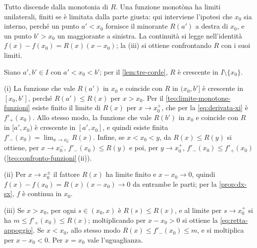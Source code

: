 \begin{schema}
\end{schema}

\begin{strategia}
Tutto discende dalla monotonia di $R$. Una funzione monotòna ha limiti unilaterali, finiti
se è limitata dalla parte giusta: qui interviene l'ipotesi che $x_{0}$ sia interno, perché
un punto $a'<x_{0}$ fornisce il minorante $R(a')$ a destra di $x_{0}$, e un punto
$b'>x_{0}$ un maggiorante a sinistra. La continuità si legge nell'identità
$f(x)-f(x_{0})=R(x)(x-x_{0})$; la (iii) si ottiene confrontando $R$ con i suoi limiti.
\end{strategia}

\begin{dimostrazione}
Siano $a',b'\in I$ con $a'<x_{0}<b'$; per il \cref{lem:tre-corde}, $R$ è crescente in
$I\setminus\{x_{0}\}$.

(i) La funzione che vale $R(a')$ in $x_{0}$ e coincide con $R$ in $(x_{0},b']$ è crescente
in $[x_{0},b']$, perché $R(a')\le R(x)$ per $x>x_{0}$. Per il \cref{teo:limite-monotone-funzioni}
esiste finito il limite di $R(x)$ per $x\to x_{0}^{+}$, che per la \eqref{eq:derivata-xi}
è $f'_{+}(x_{0})$. Allo stesso modo, la funzione che vale $R(b')$ in $x_{0}$ e coincide
con $R$ in $[a',x_{0})$ è crescente in $[a',x_{0}]$, e quindi esiste finita
$f'_{-}(x_{0})=\lim_{x\to x_{0}^{-}}R(x)$. Infine, se $x<x_{0}<y$, da $R(x)\le R(y)$ si
ottiene, per $x\to x_{0}^{-}$, $f'_{-}(x_{0})\le R(y)$ e poi, per $y\to x_{0}^{+}$,
$f'_{-}(x_{0})\le f'_{+}(x_{0})$ (\cref{teo:confronto-funzioni}\,(ii)).

(ii) Per $x\to x_{0}^{\pm}$ il fattore $R(x)$ ha limite finito e $x-x_{0}\to0$, quindi
$f(x)-f(x_{0})=R(x)(x-x_{0})\to0$ da entrambe le parti; per la \cref{prop:dx-sx}, $f$ è
continua in $x_{0}$.

(iii) Se $x>x_{0}$, per ogni $s\in(x_{0},x)$ è $R(s)\le R(x)$, e al limite per
$s\to x_{0}^{+}$ si ha $m\le f'_{+}(x_{0})\le R(x)$; moltiplicando per $x-x_{0}>0$ si
ottiene la \eqref{eq:retta-appoggio}. Se $x<x_{0}$, allo stesso modo
$R(x)\le f'_{-}(x_{0})\le m$, e si moltiplica per $x-x_{0}<0$. Per $x=x_{0}$ vale
l'uguaglianza.
\end{dimostrazione}

